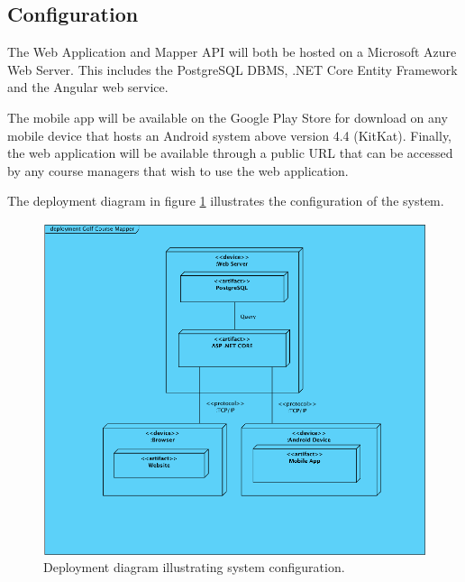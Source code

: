 \documentclass{article}
\begin{document}
    \subsection{Configuration}

    The Web Application and Mapper API will both be hosted on a Microsoft Azure
    Web Server. This includes the PostgreSQL DBMS, .NET Core Entity Framework
    and the Angular web service.

    The mobile app will be available on the Google Play Store for download on
    any mobile device that hosts an Android system above version 4.4 (KitKat).
    Finally, the web application will be available through a public URL that
    can be accessed by any course managers that wish to use the web
    application.

    The deployment diagram in figure \ref{fig:depdia} illustrates the
    configuration of the system.

    \begin{center}
        \begin{figure}[h!]
            \centering
            \includegraphics[scale=0.9]{DeploymentDiagram}
            \caption{Deployment diagram illustrating system configuration.}
            \label{fig:depdia}
        \end{figure}
    \end{center}
\end{document}
